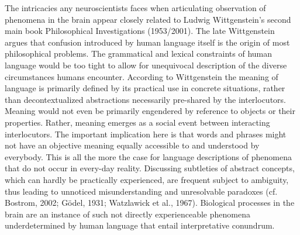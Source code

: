 \documentclass[authoryear,review,3p]{elsarticle}
\begin{document}
The intricacies any neuroscientists faces when articulating observation of phenomena in the brain appear closely related to Ludwig Wittgenstein's second main book Philosophical Investigations (1953/2001). The late Wittgenstein argues that confusion introduced by human language itself is the origin of most philosophical problems. The grammatical and lexical constraints of human language would be too tight to allow for unequivocal description of the diverse circumstances humans encounter. According to Wittgenstein the meaning of language is primarily defined by its practical use in concrete situations, rather than decontextualized abstractions necessarily pre-shared by the interlocutors. Meaning would not even be primarily engendered by reference to objects or their properties. Rather, meaning emerges as a social event between interacting interlocutors. The important implication here is that words and phrases might not have an objective meaning equally accessible to and understood by everybody. This is all the more the case for language descriptions of phenomena that do not occur in every-day reality. Discussing subtleties of abstract concepts, which can hardly be practically experienced, are frequent subject to ambiguity, thus leading to unnoticed misunderstanding and unresolvable paradoxes (cf. Bostrom, 2002; Gödel, 1931; Watzlawick et al., 1967). Biological processes in the brain are an instance of such not directly experienceable phenomena underdetermined by human language that entail interpretative conundrum.
\end{document}
